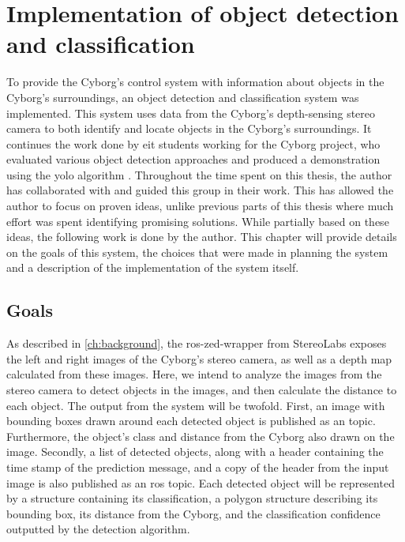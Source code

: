 \documentclass[\rootfolder/main.tex]{subfiles}
\begin{document}
\chapter{Implementation of object detection and classification} %
\label{ch:implementation-objdet} %

To provide the Cyborg's control system with information about objects in the Cyborg's surroundings, an object detection and classification system was implemented.
This system uses data from the Cyborg's depth-sensing stereo camera to both identify and locate objects in the Cyborg's surroundings.
It continues the work done by \acrfull{eit} students working for the Cyborg project, who evaluated various object detection approaches and produced a demonstration using the \acrfull{yolo} algorithm \cite{Opheim2018}.
Throughout the time spent on this thesis, the author has collaborated with and guided this group in their work.
This has allowed the author to focus on proven ideas, unlike previous parts of this thesis where much effort was spent identifying promising solutions.
While partially based on these ideas, the following work is done by the author.
This chapter will provide details on the goals of this system, the choices that were made in planning the system and a description of the implementation of the system itself.


\section{Goals}

As described in \cref{ch:background}, the ros-zed-wrapper from StereoLabs exposes the left and right images of the Cyborg's stereo camera, as well as a depth map calculated from these images.
Here, we intend to analyze the images from the stereo camera to detect objects in the images, and then calculate the distance to each object.
The output from the system will be twofold.
First, an image with bounding boxes drawn around each detected object is published as an  topic.
Furthermore, the object's class and distance from the Cyborg also drawn on the image.
Secondly, a list of detected objects, along with a header containing the time stamp of the prediction message, and a copy of the header from the input image is also published as an \acrshort{ros} topic.
Each detected object will be represented by a structure containing its classification, a polygon structure describing its bounding box, its distance from the Cyborg, and the classification confidence outputted by the detection algorithm.
\end{document}

